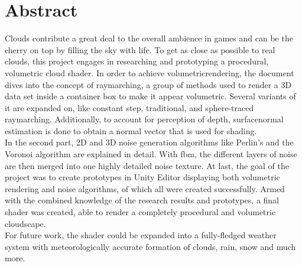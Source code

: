 \section*{Abstract}
Clouds contribute a great deal to the overall ambience in games and can be the cherry on top by filling the sky with life.
To get as close as possible to real clouds, this project engages in researching and prototyping a \gls{procedural}, volumetric cloud shader.
\emptyline
In order to achieve \gls{volumetricrendering}, the document dives into the concept of \gls{raymarching}, a group of methods used to render a 3D data set inside a container box to make it appear volumetric.
Several variants of it are expanded on, like constant step, traditional, and sphere-traced \gls{raymarching}. Additionally, to account for perception of depth, \gls{surfacenormal} estimation is done to obtain a normal vector that is used for shading.
\\
In the second part, 2D and 3D \gls{noise} generation algorithms like Perlin's and the Voronoi algorithm are explained in detail. With \gls{fbm}, the different layers of noise are then merged into one highly detailed noise texture.
\emptyline
At last, the goal of the project was to create prototypes in Unity Editor displaying both volumetric rendering and noise algorithms, of which all were created successfully.
Armed with the combined knowledge of the research results and prototypes, a final shader was created, able to render a completely \gls{procedural} and volumetric cloudscape.
\\
For future work, the shader could be expanded into a fully-fledged weather system with meteorologically accurate formation of clouds, rain, snow and much more.
